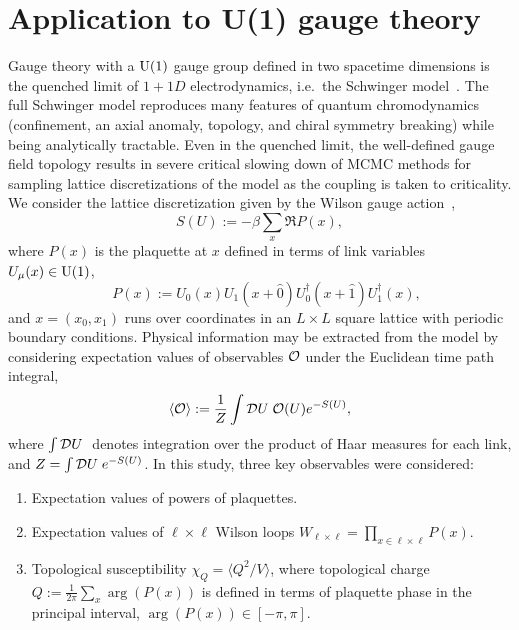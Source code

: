 \section{Application to U(1) gauge theory}
Gauge theory with a $\mathrm{U}(1)$ gauge group defined in two spacetime dimensions is the quenched limit of $1+1D$ electrodynamics, i.e.~the Schwinger model~\cite{Schwinger:1962tp}. The full Schwinger model reproduces many features of quantum chromodynamics (confinement, an axial anomaly, topology, and chiral symmetry breaking) while being analytically tractable. Even in the quenched limit, the well-defined gauge field topology results in severe critical slowing down of MCMC methods for sampling lattice discretizations of the model as the coupling is taken to criticality. We consider the lattice discretization given by the Wilson gauge action~\cite{Wilson:1974sk},
%
\begin{equation}\label{eq:action}
    S(U) := -\beta \sum_x \Re P(x),
\end{equation}
%
where $P(x)$ is the plaquette at $x$ defined in terms of link variables $U_\mu(x) \in \mathrm{U}(1)$,
%
\begin{equation} \label{eq:plaquette}
\quad P(x) := U_{0}(x) U_1(x+\hat{0}) U^\dagger_{0}(x+\hat{1}) U^\dagger_{1}(x),
\end{equation}
%
and $x = (x_0, x_1)$ runs over coordinates in an $L \times L$ square lattice with periodic boundary conditions. Physical information may be extracted from the model by considering expectation values of observables $\mathcal{O}$ under the Euclidean time path integral,
\begin{equation}
  \left< \mathcal{O} \right> := \frac{1}{Z} \int \mathcal{D}{U}\; \mathcal{O}(U) e^{-S(U)},
\end{equation}
where $\int \mathcal{D}{U}\;$ denotes integration over the product of Haar measures for each link, and $Z=\int\mathcal{D}{U}\; e^{-S(U)}$.
In this study, three key observables were considered:
%
\begin{enumerate}

    \item Expectation values of powers of plaquettes.

    \item Expectation values of $\ell \times \ell$ Wilson loops $W_{\ell \times \ell} = \prod_{x \in \ell \times \ell} P(x)$.

    \item Topological susceptibility $\chi_Q = \langle Q^2 / V \rangle$, where topological charge $Q := \frac{1}{2\pi} \sum_x \arg\left(P(x)\right)$ is defined in terms of plaquette phase in the principal interval, $\arg\left(P(x)\right) \in [-\pi, \pi]$.

\end{enumerate}

